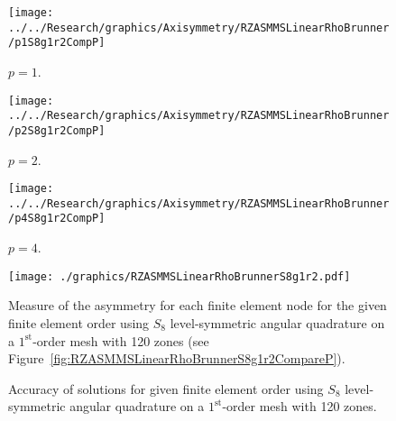 \documentclass[12pt,letterpaper]{article}
\begin{document}
\begin{sidewaysfigure}[!htb]
\centering
\begin{subfigure}{0.33\textwidth}
\texttt{[image: ../../Research/graphics/Axisymmetry/RZASMMSLinearRhoBrunner/p1S8g1r2CompP]}
\caption{$p=1$.}
\end{subfigure}%
\begin{subfigure}{0.33\textwidth}
\texttt{[image: ../../Research/graphics/Axisymmetry/RZASMMSLinearRhoBrunner/p2S8g1r2CompP]}
\caption{$p=2$.}
\end{subfigure}%
\begin{subfigure}{0.33\textwidth}
\texttt{[image: ../../Research/graphics/Axisymmetry/RZASMMSLinearRhoBrunner/p4S8g1r2CompP]}
\caption{$p=4$.}
\end{subfigure}
\caption{Relative asymmetry for $p=\{1,2,4\}$ finite elements on a $1^\text{st}$-order mesh with 120 zones for $S_8$ level-symmetric angular quadrature.}
\label{fig:RZASMMSLinearRhoBrunnerS8g1r2CompareP}
\end{sidewaysfigure}

\begin{figure}[!htb]
\centering
\texttt{[image: ./graphics/RZASMMSLinearRhoBrunnerS8g1r2.pdf]}
\caption{Measure of the asymmetry for each finite element node for the given finite element order using $S_8$ level-symmetric angular quadrature on a $1^\text{st}$-order mesh with 120 zones (see Figure~\ref{fig:RZASMMSLinearRhoBrunnerS8g1r2CompareP}).}
\label{fig:RZASMMSLinearRhoBrunnerS8g1r2Nodes}
\end{figure}

\begin{figure}[!htb]
\centering
{}
\caption{Accuracy of solutions for given finite element order using $S_8$ level-symmetric angular quadrature on a $1^\text{st}$-order mesh with 120 zones.}
\label{fig:RZASMMSLinearRhoBrunnerS8g1r2Accuracy}
\end{figure}
\end{document}
